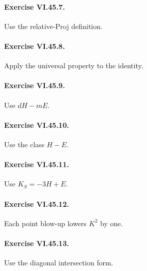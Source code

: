 \paragraph{Exercise VI.45.7.}
\begin{hint}
Use the relative-Proj definition.
\end{hint}

\paragraph{Exercise VI.45.8.}
\begin{hint}
Apply the universal property to the identity.
\end{hint}

\paragraph{Exercise VI.45.9.}
\begin{hint}
Use \(dH-mE\).
\end{hint}

\paragraph{Exercise VI.45.10.}
\begin{hint}
Use the class \(H-E\).
\end{hint}

\paragraph{Exercise VI.45.11.}
\begin{hint}
Use \(K_S=-3H+E\).
\end{hint}

\paragraph{Exercise VI.45.12.}
\begin{hint}
Each point blow-up lowers \(K^2\) by one.
\end{hint}

\paragraph{Exercise VI.45.13.}
\begin{hint}
Use the diagonal intersection form.
\end{hint}

